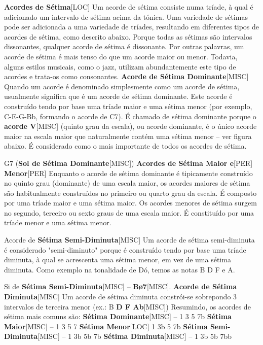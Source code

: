 \documentclass[a4paper,12pt]{article}
\begin{document}
\textbf{Acordes de Sétima}\textsc{[LOC]} Um acorde de sétima consiste numa tríade, à qual é adicionado um intervalo de sétima acima da tónica. Uma variedade de sétimas pode ser adicionada a uma variedade de tríades, resultando em diferentes tipos de acordes de sétima, como descrito abaixo. Porque todas as sétimas são intervalos dissonantes, qualquer acorde de sétima é dissonante. Por outras palavras, um acorde de sétima é mais tenso do que um acorde maior ou menor. Todavia, alguns estilos musicais, como o jazz, utilizam abundantemente este tipo de acordes e trata-os como consonantes. \textbf{Acorde de Sétima Dominante}\textsc{[MISC]} Quando um acorde é denominado simplesmente como um acorde de sétima, usualmente significa que é um acorde de sétima dominante. Este acorde é construído tendo por base uma tríade maior e uma sétima menor (por exemplo, C-E-G-Bb, formando o acorde de C7). É chamado de sétima dominante porque o \textbf{acorde V}\textsc{[MISC]} (quinto grau da escala), ou acorde dominante, é o único acorde maior na escala maior que naturalmente contém uma sétima menor -- ver figura abaixo. É considerado como o mais importante de todos os acordes de sétima.

G7 (\textbf{Sol de Sétima Dominante}\textsc{[MISC]}) \textbf{Acordes de Sétima Maior e}\textsc{[PER]} \textbf{Menor}\textsc{[PER]} Enquanto o acorde de sétima dominante é tipicamente construído no quinto grau (dominante) de uma escala maior, os acordes maiores de sétima são habitualmente construídos no primeiro ou quarto grau da escala. É composto por uma tríade maior e uma sétima maior. Os acordes menores de sétima surgem no segundo, terceiro ou sexto graus de uma escala maior. É constituído por uma tríade menor e uma sétima menor.

Acorde de \textbf{Sétima Semi-Diminuta}\textsc{[MISC]} Um acorde de sétima semi-diminuta é considerado "semi-diminuto" porque é construído tendo por base uma tríade diminuta, à qual se acrescenta uma sétima menor, em vez de uma sétima diminuta. Como exemplo na tonalidade de Dó, temos as notas B D F e A.

Si de \textbf{Sétima Semi-Diminuta}\textsc{[MISC]} -- \textbf{Bø7}\textsc{[MISC]}. \textbf{Acorde de Sétima Diminuta}\textsc{[MISC]} Um acorde de sétima diminuta constrói-se sobrepondo 3 intervalos de terceira menor (ex.: B \textbf{D F Ab}\textsc{[MISC]}) Resumindo, os acordes de sétima mais comuns são: \textbf{Sétima Dominante}\textsc{[MISC]} -- 1 3 5 7b \textbf{Sétima Maior}\textsc{[MISC]} -- 1 3 5 7 \textbf{Sétima Menor}\textsc{[LOC]} 1 3b 5 7b \textbf{Sétima Semi-Diminuta}\textsc{[MISC]} -- 1 3b 5b 7b \textbf{Sétima Diminuta}\textsc{[MISC]} -- 1 3b 5b 7bb
\end{document}
